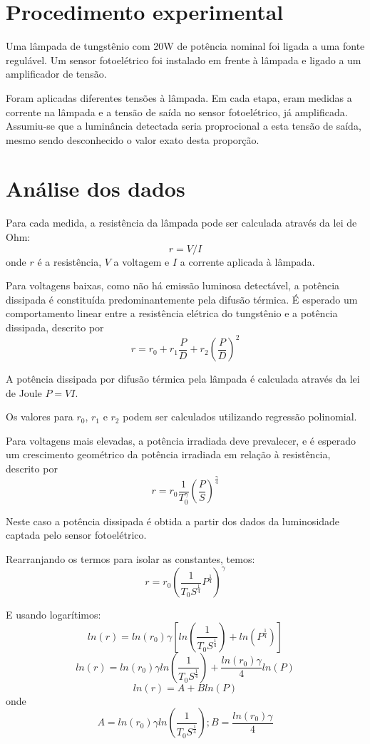 \documentclass[brazilian,12pt,a4paper,twocolumn,final]{article}
\begin{document}
\section{Procedimento experimental}
Uma lâmpada de tungstênio com 20W de potência nominal foi ligada a uma fonte regulável. 
Um sensor fotoelétrico foi instalado em frente à lâmpada e ligado a um amplificador de tensão.

Foram aplicadas diferentes tensões à lâmpada.
Em cada etapa, eram medidas a corrente na lâmpada e a tensão de saída no sensor fotoelétrico, já amplificada.
Assumiu-se que a luminância detectada seria proprocional a esta tensão de saída, mesmo sendo desconhecido o valor exato desta proporção.

\section{Análise dos dados}
Para cada medida, 
a resistência da lâmpada pode ser calculada 
através da lei de Ohm: 
$$ r=V/I$$ 
onde $r$ é a resistência, $V$ a voltagem e $I$ a corrente aplicada à lâmpada. 

Para voltagens baixas,
como não há emissão luminosa detectável, 
a potência dissipada é constituída predominantemente
pela difusão térmica.
É esperado um comportamento linear entre a 
resistência elétrica do tungstênio e a potência dissipada, descrito por
$$r=r_0+r_1\frac{P}{D}+r_2(\frac{P}{D})^2$$

A potência dissipada por difusão térmica pela lâmpada é calculada através da 
lei de Joule $ P=VI $.

Os valores para $r_0$, $r_1$ e $r_2$
podem ser calculados
utilizando regressão polinomial.

Para voltagens mais elevadas, 
a potência irradiada deve prevalecer, e
é esperado um crescimento geométrico da 
potência irradiada em relação à resistência, descrito por
$$r=r_0\frac{1}{T_0^\gamma}(\frac{P}{S})^\frac{\gamma}{4}$$

Neste caso a potência dissipada é obtida a partir dos dados da luminosidade captada
pelo sensor fotoelétrico.

Rearranjando os termos para isolar as constantes, temos:
$$r=r_0(\frac{1}{T_0S^\frac{1}{4}}P^\frac{1}{4})^\gamma$$

E usando logarítimos:
$$ln(r)=ln(r_0)\gamma[ln(\frac{1}{T_0S^\frac{1}{4}})+ln(P^\frac{1}{4})]$$
$$ln(r)=ln(r_0)\gamma ln(\frac{1}{T_0S^\frac{1}{4}})+\frac{ln(r_0)\gamma}{4}ln(P)$$
$$ln(r)=A+Bln(P)$$
onde
$$A=ln(r_0)\gamma ln(\frac{1}{T_0S^\frac{1}{4}}); B=\frac{ln(r_0)\gamma}{4}$$
\end{document}
